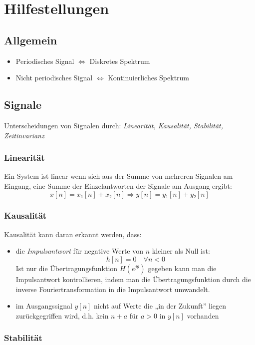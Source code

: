 \documentclass[a4paper, 12pt]{article}
\begin{document}
\section{Hilfestellungen}

\subsection{Allgemein}

\begin{itemize}
    \item Periodisches Signal $⇔$ Diskretes Spektrum
    \item Nicht periodisches Signal $⇔$ Kontinuierliches Spektrum
\end{itemize}

\subsection{Signale}

Unterscheidungen von Signalen durch: \textit{Linearität, Kausalität, Stabilität, Zeitinvarianz}

\subsubsection{Linearität}
Ein System ist linear wenn sich aus der Summe von mehreren Signalen am Eingang, eine Summe der Einzelantworten der Signale am Ausgang ergibt:
\[
    x[n] = x₁[n] + x₂[n] ⇒ y[n] = y₁[n] + y₂[n]
\]

\subsubsection{Kausalität}

Kausalität kann daran erkannt werden, dass:
\begin{itemize}
  \item die \emph{Impulsantwort} für negative Werte von $n$ kleiner als Null  ist:
  \[
          h[n]=0 \quad  ∀ n < 0
  \]
  Ist nur die Übertragungsfunktion $H(e^{j\theta})$ gegeben kann man die Impulsantwort kontrollieren, indem man die Übertragungsfunktion durch die inverse Fouriertransformation in die Impulsantwort umwandelt.
  \item im Ausgangssignal $y[n]$ nicht auf Werte die „in der Zukunft” liegen zurückgegriffen wird, d.h. kein $n+a$ für $a>0$ in $y[n]$ vorhanden
\end{itemize}

\subsubsection{Stabilität}
\end{document}
